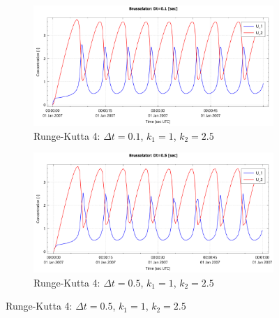 \documentclass{mooiman_memo}
\newcommand{\Dt}{\Delta t}
\begin{document}
\begin{figure}[H]\ContinuedFloat
        \begin{subfigure}{0.5\textwidth}
        \includegraphics[width=\textwidth]{figures/brusselator_rk4_dt=0d10.pdf}
        \caption{Runge-Kutta 4: $\Dt=0.1$, $k_1=1$, $k_2=2.5$}
    \end{subfigure}
    \begin{subfigure}{0.5\textwidth}
        \includegraphics[width=\textwidth]{figures/brusselator_rk4_dt=0d50.pdf}
        \caption{Runge-Kutta 4: $\Dt=0.5$, $k_1=1$, $k_2=2.5$}
    \end{subfigure}
\end{figure}
\end{document}
